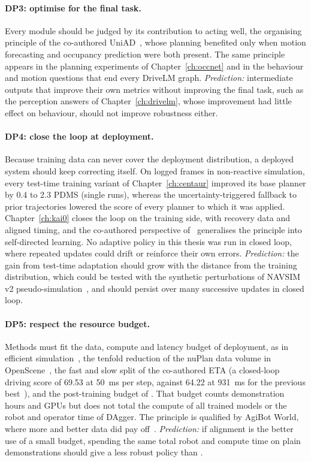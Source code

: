 \paragraph{DP3: optimise for the final task.} Every module should be judged by its contribution to acting well, the organising principle of the co-authored UniAD~\cite{hu2023uniad}, whose planning benefited only when motion forecasting and occupancy prediction were both present. The same principle appears in the planning experiments of Chapter~\ref{ch:occnet} and in the behaviour and motion questions that end every DriveLM graph. \emph{Prediction:} intermediate outputs that improve their own metrics without improving the final task, such as the perception answers of Chapter~\ref{ch:drivelm}, whose improvement had little effect on behaviour, should not improve robustness either.

\paragraph{DP4: close the loop at deployment.} Because training data can never cover the deployment distribution, a deployed system should keep correcting itself. On logged frames in non-reactive simulation, every test-time training variant of Chapter~\ref{ch:centaur} improved its base planner by 0.4 to 2.3 PDMS (single runs), whereas the uncertainty-triggered fallback to prior trajectories lowered the score of every planner to which it was applied. Chapter~\ref{ch:kai0} closes the loop on the training side, with recovery data and aligned timing, and the co-authored perspective of~\cite{chen2025robot} generalises the principle into self-directed learning. No adaptive policy in this thesis was run in closed loop, where repeated updates could drift or reinforce their own errors. \emph{Prediction:} the gain from test-time adaptation should grow with the distance from the training distribution, which could be tested with the synthetic perturbations of NAVSIM v2 pseudo-simulation~\cite{cao2025pseudo}, and should persist over many successive updates in closed loop.

\paragraph{DP5: respect the resource budget.} Methods must fit the data, compute and latency budget of deployment, as in efficient simulation~\cite{sima2021lshsmile}, the tenfold reduction of the nuPlan data volume in OpenScene~\cite{sima2023openscene}, the fast and slow split of the co-authored ETA (a closed-loop driving score of 69.53 at \SI{50}{\milli\second} per step, against 64.22 at \SI{931}{\milli\second} for the previous best~\cite{hamdan2025eta}), and the post-training budget of \chiz. That budget counts demonstration hours and GPUs but does not total the compute of all trained models or the robot and operator time of DAgger. The principle is qualified by AgiBot World, where more and better data did pay off~\cite{bu2025agibot_iros}. \emph{Prediction:} if alignment is the better use of a small budget, spending the same total robot and compute time on plain demonstrations should give a less robust policy than \chiz.

